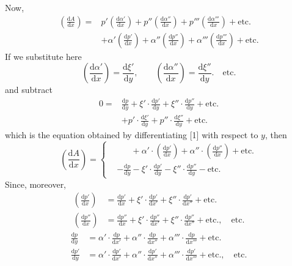 Now,
\[
\begin{aligned}
\left(\frac{\mathrm{d}A}{\mathrm{d}x}\right)={}&
p'\left(\frac{\mathrm{d}\alpha'}{\mathrm{d}x}\right)
+p''\left(\frac{\mathrm{d}\alpha''}{\mathrm{d}x}\right)
+p'''\left(\frac{\mathrm{d}\alpha'''}{\mathrm{d}x}\right)+\text{etc.}\\
&+\alpha'\left(\frac{\mathrm{d}p'}{\mathrm{d}x}\right)
+\alpha''\left(\frac{\mathrm{d}p''}{\mathrm{d}x}\right)
+\alpha'''\left(\frac{\mathrm{d}p'''}{\mathrm{d}x}\right)+\text{etc.}
\end{aligned}
\]
If we substitute here
\[
\left(\frac{\mathrm{d}\alpha'}{\mathrm{d}x}\right)=\frac{\mathrm{d}\xi'}{\mathrm{d}y},\qquad
\left(\frac{\mathrm{d}\alpha''}{\mathrm{d}x}\right)=\frac{\mathrm{d}\xi''}{\mathrm{d}y}.\quad\text{etc.}
\]
and subtract
\[
\begin{aligned}
0={}&\frac{\mathrm{d}p}{\mathrm{d}y}
+\xi'\cdot\frac{\mathrm{d}p'}{\mathrm{d}y}
+\xi''\cdot\frac{\mathrm{d}p''}{\mathrm{d}y}+\text{etc.}\\
&+p'\cdot\frac{\mathrm{d}\xi'}{\mathrm{d}y}
+p''\cdot\frac{\mathrm{d}\xi''}{\mathrm{d}y}+\text{etc.}
\end{aligned}
\]
which is the equation obtained by differentiating [1] with respect to $y$, then
\[
\left(\frac{\mathrm{d}A}{\mathrm{d}x}\right)=
\left\{\begin{aligned}
&\phantom{-\frac{\mathrm{d}p}{\mathrm{d}y}}+\alpha'\cdot\left(\frac{\mathrm{d}p'}{\mathrm{d}x}\right)
+\alpha''\cdot\left(\frac{\mathrm{d}p''}{\mathrm{d}x}\right)+\text{etc.}\\
&-\frac{\mathrm{d}p}{\mathrm{d}y}-\xi'\cdot\frac{\mathrm{d}p'}{\mathrm{d}y}
-\xi''\cdot\frac{\mathrm{d}p''}{\mathrm{d}y}-\text{etc.}
\end{aligned}\right.
\]
Since, moreover,
\[
\begin{aligned}
\left(\frac{\mathrm{d}p'}{\mathrm{d}x}\right)&=\frac{\mathrm{d}p'}{\mathrm{d}x}
+\xi'\cdot\frac{\mathrm{d}p'}{\mathrm{d}x'}
+\xi''\cdot\frac{\mathrm{d}p'}{\mathrm{d}x''}+\text{etc.}\\
\left(\frac{\mathrm{d}p''}{\mathrm{d}x}\right)&=\frac{\mathrm{d}p''}{\mathrm{d}x}
+\xi'\cdot\frac{\mathrm{d}p''}{\mathrm{d}x'}
+\xi''\cdot\frac{\mathrm{d}p''}{\mathrm{d}x''}+\text{etc.},\quad\text{etc.}
\end{aligned}
\]
\[
\begin{aligned}
\frac{\mathrm{d}p}{\mathrm{d}y}&=\alpha'\cdot\frac{\mathrm{d}p}{\mathrm{d}x'}
+\alpha''\cdot\frac{\mathrm{d}p}{\mathrm{d}x''}
+\alpha'''\cdot\frac{\mathrm{d}p}{\mathrm{d}x'''}+\text{etc.}\\
\frac{\mathrm{d}p'}{\mathrm{d}y}&=\alpha'\cdot\frac{\mathrm{d}p'}{\mathrm{d}x'}
+\alpha''\cdot\frac{\mathrm{d}p'}{\mathrm{d}x''}
+\alpha'''\cdot\frac{\mathrm{d}p'}{\mathrm{d}x'''}+\text{etc.},\quad\text{etc.}
\end{aligned}
\]
